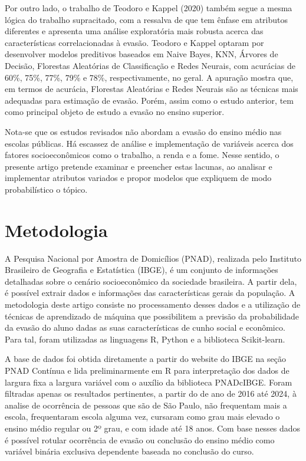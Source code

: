 \documentclass[english, spanish, brazilian]{RBIEarticle} %
\begin{document}
Por outro lado, o trabalho de Teodoro e Kappel (2020) também segue a mesma lógica do trabalho supracitado, com a ressalva de que tem ênfase em atributos diferentes e apresenta uma análise exploratória mais robusta acerca das características correlacionadas à evasão. Teodoro e Kappel optaram por desenvolver modelos preditivos baseados em Naive Bayes, KNN, Árvores de Decisão, Florestas Aleatórias de Classificação e Redes Neurais, com acurácias de 60\%, 75\%, 77\%, 79\% e 78\%, respectivamente, no geral. A apuração mostra que, em termos de acurácia, Florestas Aleatórias e Redes Neurais são as técnicas mais adequadas para estimação de evasão. Porém, assim como o estudo anterior, tem como principal objeto de estudo a evasão no ensino superior.  

Nota-se que os estudos revisados não abordam a evasão do ensino médio nas escolas públicas. Há escassez de análise e implementação de variáveis acerca dos fatores socioeconômicos como o trabalho, a renda e a fome. Nesse sentido, o presente artigo pretende examinar e preencher estas lacunas, ao analisar e implementar atributos variados e propor modelos que expliquem de modo probabilístico o tópico.

\section{Metodologia}
A Pesquisa Nacional por Amostra de Domicílios (PNAD), realizada pelo Instituto Brasileiro de Geografia e Estatística (IBGE), é um conjunto de informações detalhadas sobre o cenário socioeconômico da sociedade brasileira. A partir dela, é possível extrair dados e informações das características gerais da população. A metodologia deste artigo consiste no processamento desses dados e a utilização de técnicas de aprendizado de máquina que possibilitem a previsão da probabilidade da evasão do aluno dadas as suas características de cunho social e econômico. Para tal, foram utilizadas as linguagens R, Python e a biblioteca Scikit-learn.

A base de dados foi obtida diretamente a partir do website do IBGE na seção PNAD Contínua e lida preliminarmente em R para interpretação dos dados de largura fixa a largura variável com o auxílio da biblioteca PNADcIBGE. Foram filtradas apenas os resultados pertinentes, a partir do de ano de 2016 até 2024, à analise de ocorrência de pessoas que são de São Paulo, não frequentam mais a escola, frequentaram escola alguma vez, cursaram como grau mais elevado o ensino médio regular ou 2º grau, e com idade até 18 anos. Com base nesses dados é possível rotular ocorrência de evasão ou conclusão do ensino médio como variável binária exclusiva dependente baseada no conclusão do curso.
\end{document}
